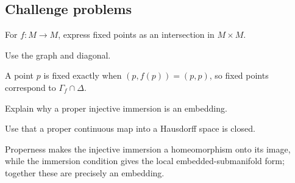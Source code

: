 \subsection*{Challenge problems}

\begin{exercise}\label{exr:vii06-ped-15}
For \(f:M\to M\), express fixed points as an intersection in \(M\times M\).
\end{exercise}
\begin{hint}
Use the graph and diagonal.
\end{hint}
\begin{solution}
A point \(p\) is fixed exactly when \((p,f(p))=(p,p)\), so fixed points correspond to \(\Gamma_f\cap\Delta\).
\end{solution}

\begin{exercise}\label{exr:vii06-ped-16}
Explain why a proper injective immersion is an embedding.
\end{exercise}
\begin{hint}
Use that a proper continuous map into a Hausdorff space is closed.
\end{hint}
\begin{solution}
Properness makes the injective immersion a homeomorphism onto its image, while the immersion condition gives the local embedded-submanifold form; together these are precisely an embedding.
\end{solution}

